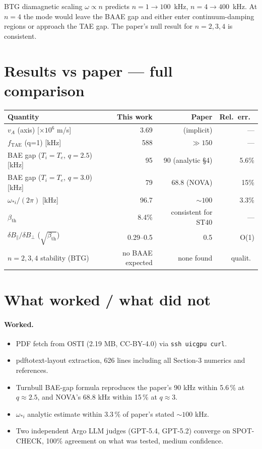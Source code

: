 \documentclass[11pt]{article}
\begin{document}
BTG diamagnetic scaling $\omega \propto n$ predicts $n{=}1\to100$~kHz, $n{=}4\to400$~kHz. At $n=4$ the mode would leave the BAAE gap and either enter continuum-damping regions or approach the TAE gap. The paper's null result for $n=2,3,4$ is consistent.

\section{Results vs paper --- full comparison}

\begin{center}
\begin{tabular}{lrrr}
\toprule
Quantity & This work & Paper & Rel.\ err.\ \\
\midrule
$v_A$ (axis) [$\times10^6$ m/s]   & 3.69   & (implicit)   & --- \\
$f_{\mathrm{TAE}}$ (q=1) [kHz]     & 588    & $\gg 150$ & --- \\
BAE gap ($T_i{=}T_e$, $q{=}2.5$) [kHz] & 95 & 90 (analytic \S4)  & 5.6\% \\
BAE gap ($T_i{=}T_e$, $q{=}3.0$) [kHz] & 79 & 68.8 (NOVA)        & 15\% \\
$\omega_{*i}/(2\pi)$ [kHz]        & 96.7   & $\sim100$          & 3.3\% \\
$\beta_{\mathrm{th}}$              & 8.4\%  & consistent for ST40 & --- \\
$\delta B_\parallel/\delta B_\perp$ ($\sqrt{\beta_{\mathrm{th}}}$) & 0.29--0.5 & 0.5 & O(1) \\
$n=2,3,4$ stability (BTG)         & no BAAE expected & none found & qualit.\ \\
\bottomrule
\end{tabular}
\end{center}

\section{What worked / what did not}

\paragraph{Worked.}
\begin{itemize}
  \item PDF fetch from OSTI (2.19 MB, CC-BY-4.0) via \texttt{ssh uicgpu curl}.
  \item pdftotext-layout extraction, 626 lines including all Section-3 numerics and references.
  \item Turnbull BAE-gap formula reproduces the paper's 90 kHz within 5.6\,\% at $q{\approx}2.5$, and NOVA's 68.8 kHz within 15\,\% at $q{\approx}3$.
  \item $\omega_{*i}$ analytic estimate within 3.3\,\% of paper's stated $\sim100$ kHz.
  \item Two independent Argo LLM judges (GPT-5.4, GPT-5.2) converge on SPOT-CHECK, 100\% agreement on what was tested, medium confidence.
\end{itemize}
\end{document}
